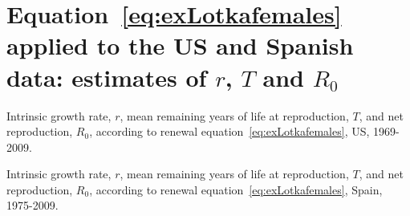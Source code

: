 \chapter{Equation~\ref{eq:exLotkafemales} applied to the US and Spanish data:
estimates of $r$, $T$ and $R_0$}
\label{appendix:exlotka1sex}
\begin{table}
\caption{Intrinsic growth rate, $r$, mean remaining years of life at
reproduction, $T$, and net reproduction, $R_0$, according to renewal
equation~\ref{eq:exLotkafemales}, US, 1969-2009.}
\label{tab:exRepUS}
\centering
{}
\end{table}

\begin{table}
\caption{Intrinsic growth rate, $r$, mean remaining years of life at
reproduction, $T$, and net reproduction, $R_0$, according to renewal
equation~\ref{eq:exLotkafemales}, Spain, 1975-2009.}
\label{tab:exRepUS}
\centering
{}
\end{table}

